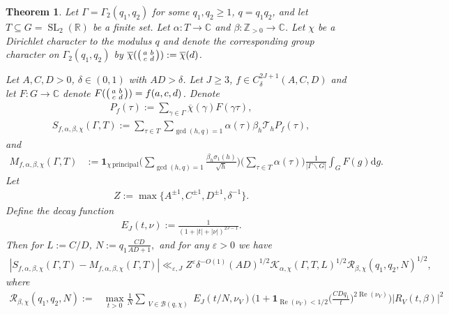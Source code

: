 \documentclass[12pt]{amsart}
\newtheorem{theorem}{Theorem}[section]
\theoremstyle{definition}
\theoremstyle{remark}
\numberwithin{equation}{section}
\newcommand{\C}{{\mathbb C}}
\newcommand{\R}{{\mathbb R}}
\newcommand{\Z}{{\mathbb Z}}
\newcommand{\1}{{\mathbf 1}}
\newcommand{\eps}{\varepsilon}
\newcommand{\SL}{\operatorname{SL}_2}
\renewcommand{\Re}{\operatorname{Re}}
\renewcommand{\d}{\mathrm d}
\begin{document}
\begin{theorem} \label{thm:Gmainblackbox}
  Let $\Gamma=\Gamma_2(q_1,q_2)$ for some $q_1,q_2 \geq 1$, $q=q_1q_2$, and let $T \subseteq G= \SL(\R)$ be a finite set. Let $\alpha: T \to \C$ and $\beta:\Z_{> 0} \to \C$. Let $\chi$ be a Dirichlet character to the modulus $q$ and denote the corresponding group character on $\Gamma_2(q_1,q_2)$ by $\overline{\chi}(\smqty(a & b \\ c & d)) :=  \overline{\chi}(d)$. 

Let $A,C,D >0$, $\delta \in (0,1)$ with $AD > \delta$. Let $J \geq 3$, $f \in C_\delta^{2J+1}(A,C,D)$ and let $F: G \to \C$ denote  $F(\smqty(a&b \\ c& d))=f(a,c,d)$.
Denote 
\begin{align*}
    P_{f}(\tau) := \sum_{\gamma \in \Gamma} \overline{\chi}(\gamma) F(\gamma \tau), 
\end{align*}
\begin{align*}
   S_{f,\alpha,\beta,\chi}(\Gamma,T):= \sum_{\tau \in T}  \sum_{\gcd(h,q)=1} \alpha(\tau) \beta_h \mathcal{T}_h P_{f}(\tau), 
\end{align*}
and
\begin{align}\label{eq:GBB,M}
     M_{f,\alpha,\beta,\chi}(\Gamma,T)  &:= \mathbf{1}_{\chi \, \mathrm{principal}}\bigg(\sum_{\gcd(h,q)=1}\frac{\beta_h \sigma_1(h)}{\sqrt{h}}\bigg)\bigg(\sum_{\tau \in T} \alpha(\tau) \bigg) \frac{1}{|\Gamma \backslash G|}  \int_{G} F(g) \d g.
\end{align}
Let 
\begin{align*}
   Z  :=\max\{ A^{\pm 1}, C^{\pm 1}, D^{\pm 1}, \delta^{-1}\} .
\end{align*}
Define the decay function
\begin{align*}
    E_J(t,\nu):= \frac{1}{ (1+ |t|+|\nu|)^{2J-1}}.
\end{align*} 
Then for  $L:=C/D$, $N:=q_1\frac{CD}{AD+1},$ and for any $\eps > 0$ we have
\begin{align}\label{eq:Gmaintarget}
   | S_{f,\alpha,\beta,\chi}(\Gamma,T)  -   M_{f,\alpha,\beta,\chi}(\Gamma,T) |  \ll_{\eps,J}  Z^\eps \delta^{-O(1)}    (AD)^{1/2} \mathcal{K}_{\alpha,\chi}(\Gamma,T,L)^{1/2}\mathcal{R}_{\beta,\chi}(q_1,q_2,N)^{1/2},
\end{align}
where 
\begin{align*}
\mathcal{R}_{\beta,\chi}(q_1,q_2,N) := &\max_{t > 0}\frac{1}{N} \sum_{\substack{V \in\mathcal{B}(q,\chi)}} E_J(t/N,\nu_V)   \bigg( 1+\mathbf{1}_{\Re(\nu_V) < 1/2}\bigg(\frac{CD q_1 }{t}\bigg)^{2 \Re(\nu_V)} \bigg) |R_V(t,\beta)|^2 \\

\end{align*}
\end{theorem}
\end{document}
